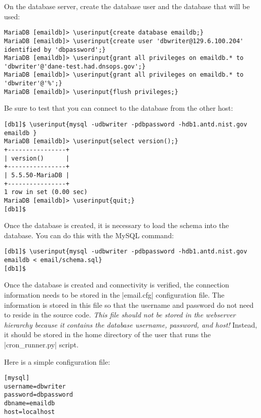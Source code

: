 \documentclass[preprint,3p,11pt]{elsarticle}
\newcommand\userinput[1]{\textbf{#1}}
\begin{document}
On the database server, create the database user and the database that
will be used:

\begin{Verbatim}[commandchars=\\\{\},fontsize=\small]
MariaDB [emaildb]> \userinput{create database emaildb;}
MariaDB [emaildb]> \userinput{create user 'dbwriter@129.6.100.204' identified by 'dbpassword';}
MariaDB [emaildb]> \userinput{grant all privileges on emaildb.* to 'dbwriter'@'dane-test.had.dnsops.gov';}
MariaDB [emaildb]> \userinput{grant all privileges on emaildb.* to 'dbwriter'@'%';}
MariaDB [emaildb]> \userinput{flush privileges;}
\end{Verbatim}

Be sure to test that you can connect to the database from the other host:

\begin{Verbatim}[commandchars=\\\{\},fontsize=\small]
[db1]$ \userinput{mysql -udbwriter -pdbpassword -hdb1.antd.nist.gov emaildb }
MariaDB [emaildb]> \userinput{select version();}
+----------------+
| version()      |
+----------------+
| 5.5.50-MariaDB |
+----------------+
1 row in set (0.00 sec)
MariaDB [emaildb]> \userinput{quit;}
[db1]$ 
\end{Verbatim}

Once the database is created, it is necessary to load the schema into
the database. You can do this with the MySQL command:

\begin{Verbatim}[commandchars=\\\{\},fontsize=\small]
[db1]$ \userinput{mysql -udbwriter -pdbpassword -hdb1.antd.nist.gov emaildb < email/schema.sql}
[db1]$
\end{Verbatim}

Once the database is created and connectivity is verified, the
connection information needs to be stored in the 
|email.cfg| configuration file. The information is stored in this file
so that the username and password do not need to reside in the source
code. \emph{This file should not be stored in the webserver
  hierarchy because it contains the database username, password, and
  host!} Instead, it should be stored in the home directory of the
user that runs the |cron_runner.py| script.

Here is a simple configuration file:

\begin{Verbatim}[commandchars=\\\{\},fontsize=\small]
[mysql]
username=dbwriter
password=dbpassword
dbname=emaildb
host=localhost
\end{Verbatim}
\end{document}
